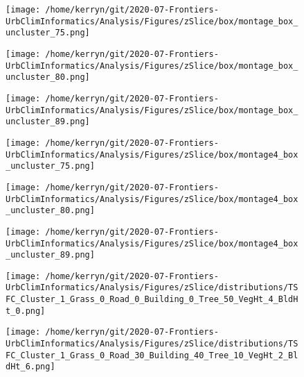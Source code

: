 \documentclass{article}
\begin{document}
\begin{figure}
\centering    
\texttt{[image: /home/kerryn/git/2020-07-Frontiers-UrbClimInformatics/Analysis/Figures/zSlice/box/montage\_box\_uncluster\_75.png]}
\end{figure} 
\clearpage

\begin{figure}
\centering    
\texttt{[image: /home/kerryn/git/2020-07-Frontiers-UrbClimInformatics/Analysis/Figures/zSlice/box/montage\_box\_uncluster\_80.png]}
\end{figure} 
\clearpage


\begin{figure}
\centering    
\texttt{[image: /home/kerryn/git/2020-07-Frontiers-UrbClimInformatics/Analysis/Figures/zSlice/box/montage\_box\_uncluster\_89.png]}
\end{figure} 
\clearpage





\begin{figure}
\centering    
\texttt{[image: /home/kerryn/git/2020-07-Frontiers-UrbClimInformatics/Analysis/Figures/zSlice/box/montage4\_box\_uncluster\_75.png]}
\end{figure} 
\clearpage

\begin{figure}
\centering    
\texttt{[image: /home/kerryn/git/2020-07-Frontiers-UrbClimInformatics/Analysis/Figures/zSlice/box/montage4\_box\_uncluster\_80.png]}
\end{figure} 
\clearpage


\begin{figure}
\centering    
\texttt{[image: /home/kerryn/git/2020-07-Frontiers-UrbClimInformatics/Analysis/Figures/zSlice/box/montage4\_box\_uncluster\_89.png]}
\end{figure} 
\clearpage


\begin{figure}
\centering    
\texttt{[image: /home/kerryn/git/2020-07-Frontiers-UrbClimInformatics/Analysis/Figures/zSlice/distributions/TSFC\_Cluster\_1\_Grass\_0\_Road\_0\_Building\_0\_Tree\_50\_VegHt\_4\_BldHt\_0.png]}
\end{figure} 
\clearpage

\begin{figure}
\centering    
\texttt{[image: /home/kerryn/git/2020-07-Frontiers-UrbClimInformatics/Analysis/Figures/zSlice/distributions/TSFC\_Cluster\_1\_Grass\_0\_Road\_30\_Building\_40\_Tree\_10\_VegHt\_2\_BldHt\_6.png]}
\end{figure} 
\clearpage
\end{document}
